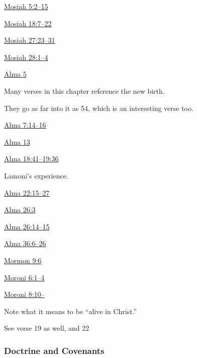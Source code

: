 		\begin{compactdesc}
			\item[{\hyperref[MOSIAH-5-2]{Mosiah 5:2--15}}]
			\item[{\hyperref[MOSIAH-18-7]{Mosiah 18:7--22}}]
			\item[{\hyperref[MOSIAH-27-23]{Mosiah 27:23--31}}]
			\item[{\hyperref[MOSIAH-28-1]{Mosiah 28:1--4}}]
			\item[{\hyperref[ALMA-5]{Alma 5}}] \phantom{.}
				\begin{compactitem}
					\item Many verses in this chapter reference the new birth.
					\item They go as far into it as 54, which is an interesting verse too.
				\end{compactitem}
			\item[{\hyperref[ALMA-7-14]{Alma 7:14--16}}]
			\item[{\hyperref[ALMA-13]{Alma 13}}]
			\item[{\hyperref[ALMA-18-41]{Alma 18:41--19:36}}] \phantom{.}
				\begin{compactitem}
					\item Lamoni's experience.
				\end{compactitem}
			\item[{\hyperref[ALMA-22-15]{Alma 22:15--27}}]
			\item[{\hyperref[ALMA-26-3]{Alma 26:3}}]
			\item[{\hyperref[ALMA-26-14]{Alma 26:14--15}}]
			\item[{\hyperref[ALMA-36-6]{Alma 36:6--26}}]
			\item[{\hyperref[MORMON-9-6]{Mormon 9:6}}]
			\item[{\hyperref[MORONI-6-1]{Moroni 6:1--4}}]
			\item[{\hyperref[MORONI-8-10]{Moroni 8:10--}}] \phantom{.}
				\begin{compactitem}
					\item Note what it means to be ``alive in Christ.''
					\item See verse 19 as well, and 22
				\end{compactitem}
		\end{compactdesc}
		
	\subsubsection{Doctrine and Covenants} %
		\label{NEWBIRTH-DC}
	
